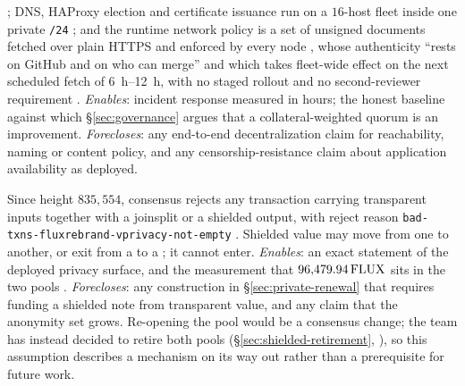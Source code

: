 \begin{assumption}
\label{asm:a7-operated}
 ;
DNS, HAProxy election and certificate issuance run on a $16$-host fleet inside one private
\texttt{/24} ; and the runtime
network policy is a set of unsigned documents fetched over plain HTTPS and enforced by every node
, whose authenticity
``rests on GitHub and on who can merge'' and which takes fleet-wide effect on the next scheduled
fetch of \qty{6}{\hour}--\qty{12}{\hour}, with no staged rollout and no second-reviewer requirement
.
\emph{Enables}: incident response measured in hours; the honest baseline against which
\S\ref{sec:governance} argues that a collateral-weighted quorum is an improvement.
\emph{Forecloses}: any end-to-end decentralization claim for reachability, naming or content policy,
and any censorship-resistance claim about application availability as deployed.
\end{assumption}

\begin{assumption}
\label{asm:a8-shielded}
\shipped Since height $835{,}554$, consensus rejects any transaction carrying transparent inputs
together with a joinsplit or a shielded output, with reject reason
\texttt{bad-\allowbreak{}txns-\allowbreak{}fluxrebrand-\allowbreak{}vprivacy-\allowbreak{}not-\allowbreak{}empty} . Shielded
value may move from one \zaddr to another, or exit from a \zaddr to a \taddr; it cannot enter.
\emph{Enables}: an exact statement of the deployed privacy surface, and the measurement that
$96{,}479.94\,\mathrm{FLUX}$ sits in the two pools
.
\emph{Forecloses}: any construction in \S\ref{sec:private-renewal} that requires funding a shielded
note from transparent value, and any claim that the anonymity set grows. Re-opening the pool would be
a consensus change; the team has instead decided to retire both pools
(\S\ref{sec:shielded-retirement}, ), so this assumption
describes a mechanism on its way out rather than a prerequisite for future work.
\end{assumption}

